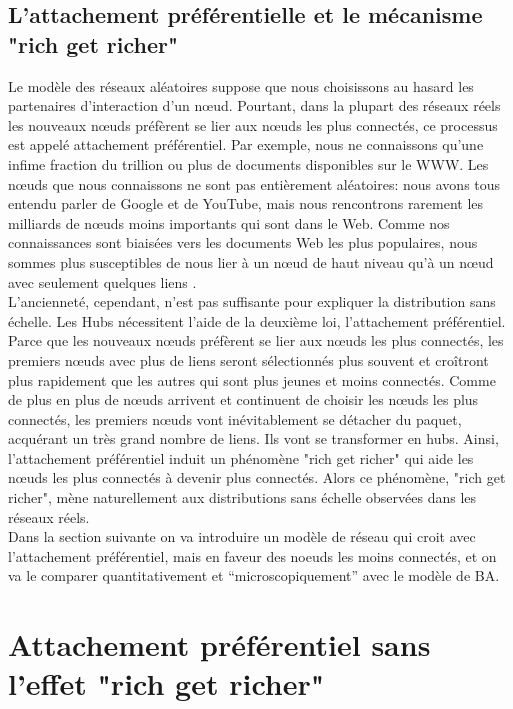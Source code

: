 	\subsection{L'attachement préférentielle et le mécanisme "rich get richer"}
Le modèle des réseaux aléatoires suppose que nous choisissons au hasard les partenaires d'interaction d'un nœud. 
Pourtant, dans la plupart des réseaux réels les nouveaux nœuds préfèrent se lier aux nœuds les plus connectés, 
ce processus est appelé attachement préférentiel. Par exemple, nous ne connaissons qu'une infime fraction du trillion 
ou plus de documents disponibles sur le WWW. Les nœuds que nous connaissons ne sont pas entièrement aléatoires: nous
avons tous entendu parler de Google et de YouTube, mais nous rencontrons rarement les milliards de nœuds moins
importants qui sont dans le Web. Comme nos connaissances sont biaisées vers les documents Web les plus populaires,
nous sommes plus susceptibles de nous lier à un nœud de haut niveau qu'à un nœud avec seulement quelques liens
\cite{Barabasi2002}.\\
L'ancienneté, cependant, n'est pas suffisante pour expliquer la distribution sans échelle. Les Hubs nécessitent l'aide de 
la deuxième loi, l'attachement préférentiel. Parce que les nouveaux nœuds préfèrent se lier aux nœuds les plus connectés,
les premiers nœuds avec plus de liens seront sélectionnés plus souvent et croîtront plus rapidement que les autres qui 
sont plus jeunes et moins connectés. Comme de plus en plus de nœuds arrivent et continuent de choisir les nœuds les 
plus connectés, les premiers nœuds vont inévitablement se détacher du paquet, acquérant un très grand nombre de liens.
Ils vont se transformer en hubs. Ainsi, l'attachement préférentiel induit un phénomène "rich get richer" qui aide les
nœuds les plus connectés à devenir plus connectés. Alors ce phénomène, "rich get richer", mène naturellement aux distributions sans échelle observées dans les réseaux réels.\\
Dans la section suivante on va introduire un modèle de réseau qui croit avec l'attachement préférentiel, mais en faveur des noeuds les moins connectés, et on va le comparer quantitativement et ``microscopiquement'' avec le modèle de BA.
\begin{sloppypar}
	\section{Attachement préférentiel sans l'effet "rich get richer"}
\end{sloppypar}
